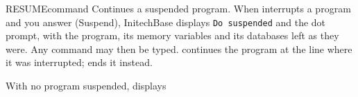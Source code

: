 \begin{XbaseEntry}{RESUME}{command}
Continues a suspended program.
\Syntax
{}
\Usage
When  interrupts a program and you answer  (Suspend),
InitechBase displays \texttt{Do suspended} and the dot prompt, with the
program, its memory variables and its databases left as they were.  Any
command may then be typed.   continues the program at the line
where it was interrupted;  ends it instead.

With no program suspended,  displays 
\end{XbaseEntry}

